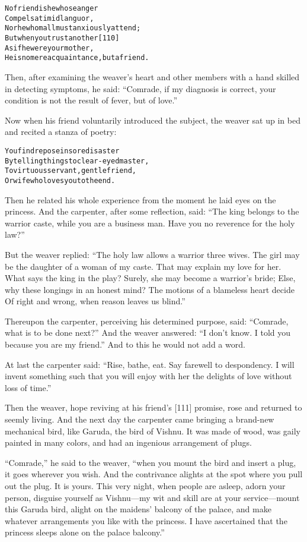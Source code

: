 \documentclass{article}
\renewenvironment{verbatim}{\begin{alltt}\normalfont\begin{centering}}{\end{centering}\end{alltt}}
\begin{document}
\begin{verbatim}
No friend is he whose anger
Compels a timid languor,
    Nor he whom all must anxiously attend;
But when you trust another                              [110]
As if he were your mother,
    He is no mere acquaintance, but a friend.
\end{verbatim}
Then, after examining the weaver's heart and other members with a
hand skilled in detecting symptoms, he said:
``Comrade, if my diagnosis is correct, your condition is not the result of fever, but of love.''

Now when his friend voluntarily introduced the subject, the weaver
sat up in bed and recited a stanza of poetry:

\begin{verbatim}
You find repose in sore disaster
By telling things to clear-eyed master,
To virtuous servant, gentle friend,
Or wife who loves you to the end.
\end{verbatim}
Then he related his whole experience from the moment he laid eyes
on the princess. And the carpenter, after some reflection, said:
``The king belongs to the warrior caste, while you are a business man. Have you no reverence for the holy law?''

But the weaver replied:
``The holy law allows a warrior three wives. The girl may be the daughter of a woman of my caste. That may explain my love for her. What says the king in the play? Surely, she may become a warrior's bride; Else, why these longings in an honest mind? The motions of a blameless heart decide Of right and wrong, when reason leaves us blind.''

Thereupon the carpenter, perceiving his determined purpose, said:
``Comrade, what is to be done next?'' And the weaver answered:
``I don't know. I told you because you are my friend.'' And to this
he would not add a word.

At last the carpenter said:
``Rise, bathe, eat. Say farewell to despondency. I will invent something such that you will enjoy with her the delights of love without loss of time.''

Then the weaver, hope reviving at his friend's [111] promise, rose
and returned to seemly living. And the next day the carpenter came
bringing a brand-new mechanical bird, like Garuda, the bird of
Vishnu. It was made of wood, was gaily painted in many colors, and
had an ingenious arrangement of plugs.

``Comrade,'' he said to the weaver,
``when you mount the bird and insert a plug, it goes wherever you wish. And the contrivance alights at the spot where you pull out the plug. It is yours. This very night, when people are asleep, adorn your person, disguise yourself as Vishnu---my wit and skill are at your service---mount this Garuda bird, alight on the maidens' balcony of the palace, and make whatever arrangements you like with the princess. I have ascertained that the princess sleeps alone on the palace balcony.''
\end{document}
